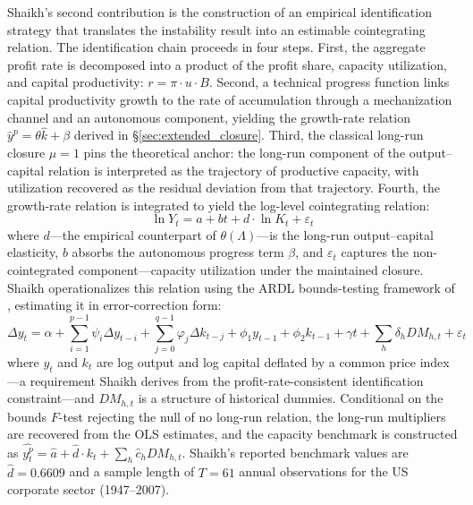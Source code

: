 Shaikh's second contribution is the construction of an empirical identification strategy that translates the instability result into an estimable cointegrating relation. The identification chain proceeds in four steps. First, the aggregate profit rate is decomposed into a product of the profit share, capacity utilization, and capital productivity: $r = \pi \cdot u \cdot B$. Second, a technical progress function links capital productivity growth to the rate of accumulation through a mechanization channel and an autonomous component, yielding the growth-rate relation $\hat{y}^p = \theta\hat{k} + \beta$ derived in \S\ref{sec:extended_closure}. Third, the classical long-run closure $\mu = 1$ pins the theoretical anchor: the long-run component of the output--capital relation is interpreted as the trajectory of productive capacity, with utilization recovered as the residual deviation from that trajectory. Fourth, the growth-rate relation is integrated to yield the log-level cointegrating relation:
%
\begin{equation}\label{eq:shaikh_coint_s33}
	\ln Y_t = a + bt + d \cdot \ln K_t + \varepsilon_t
\end{equation}
%
where $d$---the empirical counterpart of $\theta(\Lambda)$---is the long-run output--capital elasticity, $b$ absorbs the autonomous progress term $\beta$, and $\varepsilon_t$ captures the non-cointegrated component---capacity utilization under the maintained closure. Shaikh operationalizes this relation using the ARDL bounds-testing framework of \citet{Pesaran2001}, estimating it in error-correction form:
%
\begin{equation}\label{eq:shaikh_ecm_s33}
	\Delta y_t = \alpha + \sum_{i=1}^{p-1}\psi_i \Delta y_{t-i} + \sum_{j=0}^{q-1}\varphi_j \Delta k_{t-j} + \phi_1 y_{t-1} + \phi_2 k_{t-1} + \gamma t + \sum_h \delta_h DM_{h,t} + \varepsilon_t
\end{equation}
%
where $y_t$ and $k_t$ are log output and log capital deflated by a common price index---a requirement Shaikh derives from the profit-rate-consistent identification constraint---and $DM_{h,t}$ is a structure of historical dummies. Conditional on the bounds $F$-test rejecting the null of no long-run relation, the long-run multipliers are recovered from the OLS estimates, and the capacity benchmark is constructed as $\widehat{y_t^p} = \hat{a} + \hat{d} \cdot k_t + \sum_h \hat{c}_h DM_{h,t}$. Shaikh's reported benchmark values are $\hat{d} = 0.6609$ and a sample length of $T = 61$ annual observations for the US corporate sector (1947--2007).

